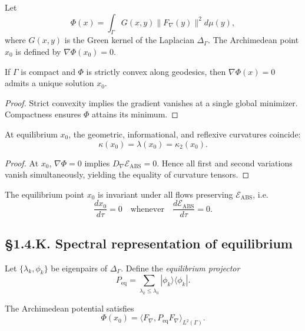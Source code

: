 \begin{definition}
Let
\[
\Phi(x)
 = \int_\Gamma G(x,y)\|F_\nabla(y)\|^2 d\mu(y),
\]
where $G(x,y)$ is the Green kernel of the Laplacian $\Delta_\Gamma$.  
The Archimedean point $x_0$ is defined by $\nabla\Phi(x_0)=0$.
\end{definition}

\begin{lemma}\label{lem:1.4.archimedes}
If $\Gamma$ is compact and $\Phi$ is strictly convex along geodesics, 
then $\nabla\Phi(x)=0$ admits a unique solution $x_0$.
\end{lemma}

\begin{proof}
Strict convexity implies the gradient vanishes at a single global minimizer.  
Compactness ensures $\Phi$ attains its minimum.
\end{proof}

\begin{theorem}\label{thm:1.4.archid}
At equilibrium $x_0$, the geometric, informational, and reflexive curvatures coincide:
\[
\kappa(x_0) = \lambda(x_0) = \kappa_2(x_0).
\]
\end{theorem}

\begin{proof}
At $x_0$, $\nabla\Phi=0$ implies $D_\nabla\mathcal E_{\mathrm{ABS}}=0$.  
Hence all first and second variations vanish simultaneously, yielding the equality of curvature tensors.
\end{proof}

\begin{corollary}
The equilibrium point $x_0$ is invariant under all flows preserving $\mathcal E_{\mathrm{ABS}}$, i.e.
\[
\frac{d x_0}{d\tau}=0
\quad\text{whenever}\quad
\frac{d\mathcal E_{\mathrm{ABS}}}{d\tau}=0.
\]
\end{corollary}

\subsection*{§1.4.K. Spectral representation of equilibrium}

Let $\{\lambda_k,\phi_k\}$ be eigenpairs of $\Delta_\Gamma$.  
Define the \emph{equilibrium projector}
\[
P_{\mathrm{eq}} = \sum_{\lambda_k\le\lambda_0}|\phi_k\rangle\langle\phi_k|.
\]

\begin{theorem}\label{thm:1.4.speq}
The Archimedean potential satisfies
\[
\Phi(x_0)=\langle F_\nabla, P_{\mathrm{eq}}F_\nabla\rangle_{L^2(\Gamma)}.
\]
\end{theorem}

